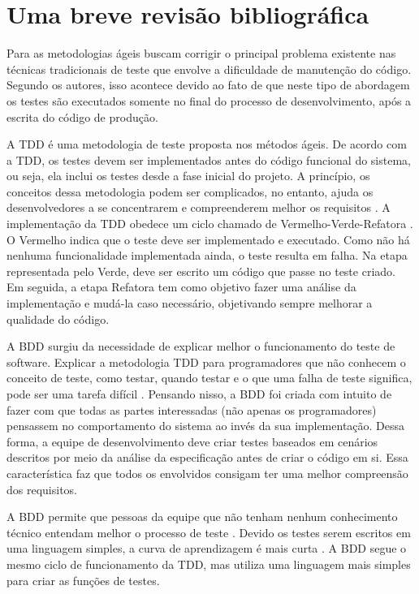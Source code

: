 \chapter{Uma breve revisão bibliográfica}\label{CAP:2}


Para \cite{palod2016agile} as metodologias ágeis buscam corrigir o principal problema existente nas técnicas tradicionais de teste que envolve a dificuldade de manutenção do código. Segundo os autores, isso acontece devido ao fato de que neste tipo de abordagem os testes são executados somente no final do processo de desenvolvimento, após a escrita do código de produção. 

A TDD é uma metodologia de teste proposta nos métodos ágeis. De acordo com a TDD, os testes devem ser implementados antes do código funcional do sistema, ou seja, ela inclui os testes desde a fase inicial do projeto. A princípio, os conceitos dessa metodologia podem ser complicados, no entanto, ajuda os desenvolvedores a se concentrarem e compreenderem melhor os requisitos \cite{moe2019comparative}. A implementação da TDD obedece um ciclo chamado de Vermelho-Verde-Refatora \cite{bulgareli2015requisitos}. O Vermelho indica que o teste deve ser implementado e executado. Como não há nenhuma funcionalidade implementada ainda, o teste resulta em falha. Na etapa representada pelo Verde, deve ser escrito um código que passe no teste criado. Em seguida, a etapa Refatora tem como objetivo fazer uma análise da implementação e mudá-la caso necessário, objetivando sempre melhorar a qualidade do código. 

A BDD surgiu da necessidade de explicar melhor o funcionamento do teste de software. Explicar a metodologia TDD para programadores que não conhecem o conceito de teste, como testar, quando testar e o que uma falha de teste significa, pode ser uma tarefa difícil \cite{bulgareli2015requisitos}. Pensando nisso, a BDD foi criada com intuito de fazer com que todas as partes interessadas (não apenas os programadores) pensassem no comportamento do sistema ao invés da sua implementação. Dessa forma, a equipe de desenvolvimento deve criar testes baseados em cenários descritos por meio da análise da especificação antes de criar o código em si. Essa característica faz que todos os envolvidos consigam ter uma melhor compreensão dos requisitos. 

A BDD permite que pessoas da equipe que não tenham nenhum conhecimento técnico entendam melhor o processo de teste \cite{barus2019implementaion}. Devido os testes serem escritos em uma linguagem simples, a curva de aprendizagem é mais curta \cite{moe2019comparative}. A BDD segue o mesmo ciclo de funcionamento da TDD, mas utiliza uma linguagem mais simples para criar as funções de testes. 

